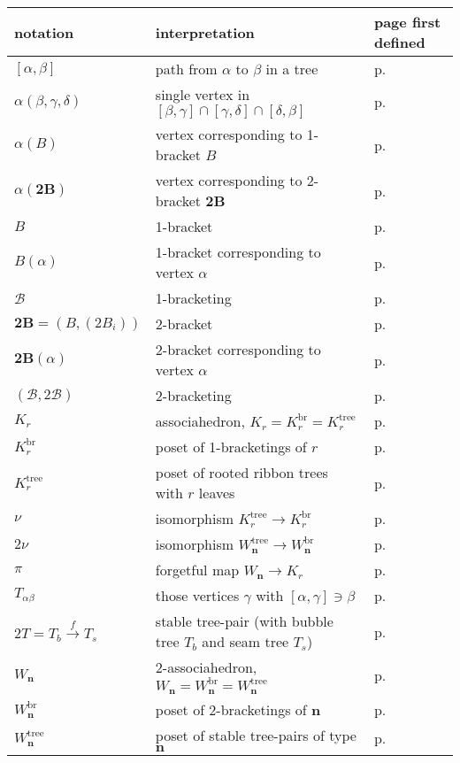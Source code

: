 \documentclass[11pt]{amsart}
\theoremstyle{definition}
\theoremstyle{remark}
\theoremstyle{plain}
\newcommand\bn{\mathbf{n}}
\newcommand{\btB}{{\mathbf{2B}}}
\newcommand{\sB}{\mathscr{B}}
\newcommand{\stB}{2\mathscr{B}}
\newcommand{\on}{\operatorname}
\newcommand{\tree}{{\on{tree}}}
\newcommand{\br}{{\on{br}}}
\begin{document}
\begin{center}
\begin{tabular}{l|l|l}
notation & interpretation & page first defined \\
\hline
$[\alpha,\beta]$ & path from $\alpha$ to $\beta$ in a tree & p.\ \pageref{p:path} \\
$\alpha(\beta,\gamma,\delta)$ & single vertex in $[\beta,\gamma]\cap[\gamma,\delta]\cap[\delta,\beta]$ & p.\ \pageref{p:alpha_triple} \\
$\alpha(B)$ & vertex corresponding to 1-bracket $B$ & p.\ \pageref{p:alpha_B} \\
$\alpha(\btB)$ & vertex corresponding to 2-bracket $\btB$ & p.\ \pageref{p:alpha_2B} \\
$B$ & 1-bracket & p.\ \pageref{p:B} \\
$B(\alpha)$ & 1-bracket corresponding to vertex $\alpha$ & p.\ \pageref{p:Balpha} \\
$\sB$ & 1-bracketing & p.\ \pageref{p:sB} \\
$\btB = (B,(2B_i))$ & 2-bracket & p.\ \pageref{p:btB} \\
$\btB(\alpha)$ & 2-bracket corresponding to vertex $\alpha$ & p.\ \pageref{p:btBalpha} \\
$(\sB,\stB)$ & 2-bracketing & p.\ \pageref{p:sBstB} \\
$K_r$ & associahedron, $K_r=K_r^\br=K_r^\tree$ & p.\ \pageref{p:Kr} \\
$K_r^\br$ & poset of 1-bracketings of $r$ & p.\ \pageref{p:Krbr} \\
$K_r^\tree$ & poset of rooted ribbon trees with $r$ leaves & p.\ \pageref{deflem:Krtree_poset} \\
$\nu$ & isomorphism $K_r^\tree \to K_r^\br$ & p.\ \pageref{p:nu} \\
$2\nu$ & isomorphism $W_\bn^\tree \to W_\bn^\br$ & p.\ \pageref{p:2nu} \\
$\pi$ & forgetful map $W_\bn \to K_r$ & p.\ \pageref{p:forgetful} \\
$T_{\alpha\beta}$ & those vertices $\gamma$ with $[\alpha,\gamma]\ni\beta$ & p.\ \pageref{p:Talphabeta} \\
$2T = T_b \stackrel{f}{\to} T_s$ & stable tree-pair (with bubble tree $T_b$ and seam tree $T_s$) & p.\ \pageref{p:2T} \\
$W_\bn$ & 2-associahedron, $W_\bn = W_\bn^\br = W_\bn^\tree$ & p.\ \pageref{p:Wn} \\
$W_\bn^\br$ & poset of 2-bracketings of $\bn$ & p.\ \pageref{p:Wnbr} \\
$W_\bn^\tree$ & poset of stable tree-pairs of type $\bn$ & p.\ \pageref{p:Wntree}
\end{tabular}
\end{center}
\end{document}
